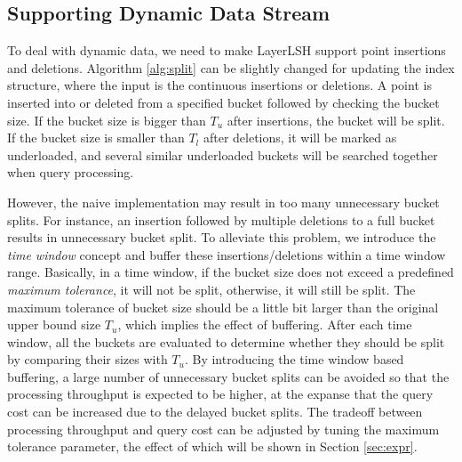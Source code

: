 \subsection{Supporting Dynamic Data Stream}

To deal with dynamic data, we need to make LayerLSH support point insertions and deletions. Algorithm \ref{alg:split} can be slightly changed for updating the index structure, where the input is the continuous insertions or deletions. A point is inserted into or deleted from a specified bucket followed by checking the bucket size. If the bucket size is bigger than $T_u$ after insertions, the bucket will be split. If the bucket size is smaller than $T_l$ after deletions, it will be marked as underloaded, and several similar underloaded buckets will be searched together when query processing.

However, the naive implementation may result in too many unnecessary bucket splits. For instance, an insertion followed by multiple deletions to a full bucket results in unnecessary bucket split. To alleviate this problem, we introduce the \textit{time window} concept and buffer these insertions/deletions within a time window range. Basically, in a time window, if the bucket size does not exceed a predefined \textit{maximum tolerance}, it will not be split, otherwise, it will still be split. The maximum tolerance of bucket size should be a little bit larger than the original upper bound size $T_u$, which implies the effect of buffering. After each time window, all the buckets are evaluated to determine whether they should be split by comparing their sizes with $T_u$. By introducing the time window based buffering, a large number of unnecessary bucket splits can be avoided so that the processing throughput is expected to be higher, at the expanse that the query cost can be increased due to the delayed bucket splits. The tradeoff between processing throughput and query cost can be adjusted by tuning the maximum tolerance parameter, the effect of which will be shown in Section \ref{sec:expr}.

